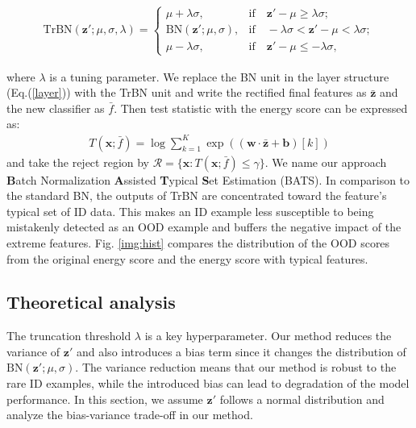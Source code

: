 \documentclass{article}
\newcommand{\benr}{\begin{eqnarray}}
\newcommand{\eenr}{\end{eqnarray}}
\newcommand{\cR}{\mathcal R}
\def\rvx{{\mathbf{x}}}
\def\rvz{{\mathbf{z}}}
\begin{document}
\benr
\text{TrBN}(\rvz'; \mu, \sigma, \lambda) =  \begin{cases}
\mu + \lambda \sigma, & \text{if} \quad \rvz' - \mu \geq \lambda \sigma; \\
\text{BN}(\rvz'; \mu, \sigma),  & \text{if} \quad -\lambda \sigma < \rvz' - \mu < \lambda \sigma  ; \\
\mu - \lambda \sigma, & \text{if}\quad  \rvz' - \mu \leq  -\lambda \sigma,
\end{cases}
\eenr

where $\lambda$ is a tuning parameter.
We replace the BN unit in the layer structure (Eq.(\ref{layer})) with the TrBN unit and write the rectified final features as $\bar {\mathbf{z}}$ and the new classifier as $\bar f$. 
Then test statistic with the energy score can be expressed as:
\benr
T(\rvx; \bar f) = \log \sum_{k=1}^{K} \exp({(\mathbf{w}\cdot \bar{\mathbf{z}}+\mathbf{b})}[k])
\eenr
and take the reject region by $\cR=\{\rvx: T(\rvx; \bar f)\leq\gamma\}.$ 
We name our approach \textbf{B}atch Normalization \textbf{A}ssisted \textbf{T}ypical \textbf{S}et Estimation (BATS). In comparison to the standard BN, the outputs of TrBN are concentrated toward the feature's typical set of ID data. This makes an ID example less susceptible to being mistakenly detected as an OOD example and buffers the negative impact of the extreme features. Fig. \ref{img:hist} compares the distribution of the OOD scores from the original energy score and the energy score with typical features.



\subsection{Theoretical analysis} \label{sec43}


The truncation threshold $\lambda$ is a key hyperparameter. 
Our method reduces the variance of $\rvz'$ and also introduces a bias term since it changes the distribution of $\text{BN}(\rvz'; \mu, \sigma).$ 
The variance reduction means that our method is robust to the rare ID examples, while the introduced bias can lead to degradation of the model performance.
In this section, we assume $\rvz'$ follows a normal distribution and analyze the bias-variance trade-off in our method. 
\end{document}
